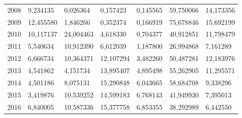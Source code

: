 \begin{table}
\begin{tabular}{p{1cm}p{2cm}p{2cm}p{2cm}p{2cm}p{2cm}p{2cm}}
 2008 &                                     9,234135 &                                           0,026364 &                        0,157423 &                         0,145565 &                      59,750066 &                           14,173356 \\
 2009 &                                    12,455580 &                                           1,846266 &                        0,352374 &                         0,166919 &                      75,678846 &                           15,692199 \\
 2010 &                                    10,117137 &                                          24,004463 &                        4,618330 &                         0,704377 &                      40,912851 &                           11,798479 \\
 2011 &                                     5,540634 &                                          10,912390 &                        6,612039 &                         1,187800 &                      26,994868 &                            7,161289 \\
 2012 &                                     6,666734 &                                          10,364371 &                       12,107294 &                         3,482260 &                      50,487281 &                           12,183976 \\
 2013 &                                     4,541862 &                                           4,151734 &                       13,895407 &                         4,895498 &                      55,262905 &                           11,295571 \\
 2014 &                                     4,501186 &                                           8,075131 &                       15,290848 &                         6,043665 &                      58,684708 &                            9,338296 \\
 2015 &                                     3,419876 &                                          10,539252 &                       14,599183 &                         6,768143 &                      41,949930 &                            7,395013 \\
 2016 &                                     6,840005 &                                          10,587336 &                       15,377758 &                         6,853355 &                      38,292989 &                            6,442550 \\
\bottomrule
\end{tabular}
\end{table}
